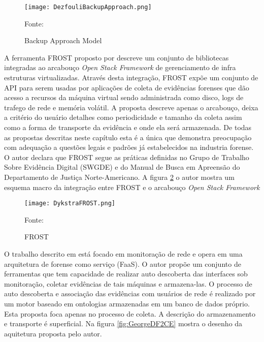 \begin{figure}[htb!]
\footnotesize
\caption{Backup Approach Model}
\texttt{[image: DezfouliBackupApproach.png]}
\centering
\label{fig:DezfouliBackupApproach}
\begin{center}
Fonte: \cite{DezfouliBackupApproach:2012} 
\end{center}
\end{figure}

A ferramenta FROST proposto por \cite{DykstraFROST:2013} descreve um conjunto de bibliotecas integradas ao arcabouço \textit{Open Stack Framework} de gerenciamento de infra estruturas virtualizadas.
%
Através desta integração, FROST expõe um conjunto de API para serem usadas por aplicações de coleta de evidências forenses que dão acesso a recursos da máquina virtual sendo administrada como disco, logs de trafego de rede e memória volátil.
%
A proposta descreve apenas o arcabouço, deixa a critério do usuário detalhes como periodicidade e tamanho da coleta assim como a forma de transporte da evidência e onde ela será armazenada.
%
De todas as propostas descritas neste capítulo esta é a única que demonstra preocupação com adequação a questões legais e padrões já estabelecidos na industria forense.
%
O autor declara que FROST segue as práticas definidas no Grupo de Trabalho Sobre Evidência Digital (SWGDE) e do Manual de Busca em Apreensão do Departamento de Justiça Norte-Americano.
%
A figura \ref{fig:DykstraFROST} o autor mostra um esquema macro da integração entre FROST e o arcabouço \textit{Open Stack Framework}

\begin{figure}[htb!]
\footnotesize
\caption{FROST}
\texttt{[image: DykstraFROST.png]}
\centering
\label{fig:DykstraFROST}
\begin{center}
Fonte: \cite{DykstraFROST:2013} 
\end{center}
\end{figure}
%

O trabalho descrito em \cite{GeorgeDF2CE:2012} está focado em monitoração de rede e opera em uma arquitetura de forense como serviço (FaaS). 
%
O autor propõe um conjunto de ferramentas que tem capacidade de realizar auto descoberta das interfaces sob monitoração, coletar evidências de tais máquinas e armazena-las.
%
O processo de auto descoberta e associação das evidências com usuários de rede é realizado por um motor baseado em ontologias armazenadas em um banco de dados próprio.
%
Esta proposta foca apenas no processo de coleta. A descrição do armazenamento e transporte é superficial.
%
Na figura \ref{fig:GeorgeDF2CE} mostra o desenho da aquitetura proposta pelo autor.

